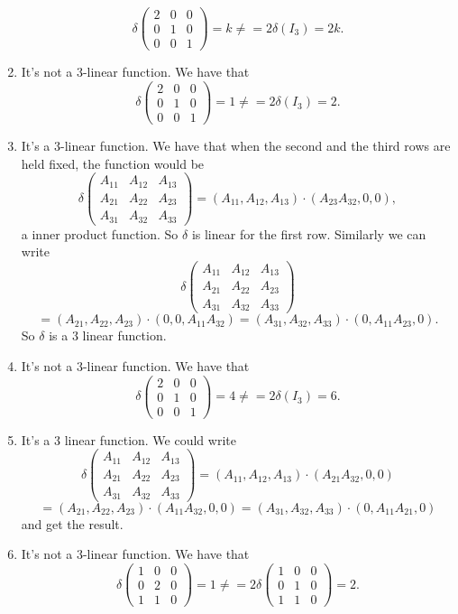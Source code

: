 \begin{enumerate}
\[\delta\begin{pmatrix}2&0&0\\0&1&0\\0&0&1\end{pmatrix}=k\neq =2\delta(I_3)=2k.\]
\item It's not a $3$-linear function. We have that 
\[\delta\begin{pmatrix}2&0&0\\0&1&0\\0&0&1\end{pmatrix}=1\neq =2\delta(I_3)=2.\]
\item It's a $3$-linear function. We have that when the second and the third rows are held fixed, the function would be 
\[\delta\begin{pmatrix}A_{11}&A_{12}&A_{13}\\A_{21}&A_{22}&A_{23}\\A_{31}&A_{32}&A_{33}\end{pmatrix}=(A_{11},A_{12},A_{13})\cdot (A_{23}A_{32},0,0),\]
a inner product function. So $\delta $ is linear for the first row. Similarly we can write 
\[\delta\begin{pmatrix}A_{11}&A_{12}&A_{13}\\A_{21}&A_{22}&A_{23}\\A_{31}&A_{32}&A_{33}\end{pmatrix}\]
\[=(A_{21},A_{22},A_{23})\cdot (0,0,A_{11}A_{32})=(A_{31},A_{32},A_{33})\cdot (0,A_{11}A_{23},0).\]
So $\delta $ is a $3$ linear function.
\item It's not a $3$-linear function. We have that 
\[\delta\begin{pmatrix}2&0&0\\0&1&0\\0&0&1\end{pmatrix}=4\neq =2\delta(I_3)=6.\]
\item It's a $3$ linear function. We could write 
\[\delta\begin{pmatrix}A_{11}&A_{12}&A_{13}\\A_{21}&A_{22}&A_{23}\\A_{31}&A_{32}&A_{33}\end{pmatrix}=(A_{11},A_{12},A_{13})\cdot (A_{21}A_{32},0,0)\]
\[=(A_{21},A_{22},A_{23})\cdot (A_{11}A_{32},0,0)=(A_{31},A_{32},A_{33})\cdot (0,A_{11}A_{21},0)\]
and get the result.
\item It's not a $3$-linear function. We have that 
\[\delta\begin{pmatrix}1&0&0\\0&2&0\\1&1&0\end{pmatrix}=1\neq =2\delta\begin{pmatrix}1&0&0\\0&1&0\\1&1&0\end{pmatrix}=2.\]

\end{enumerate}
